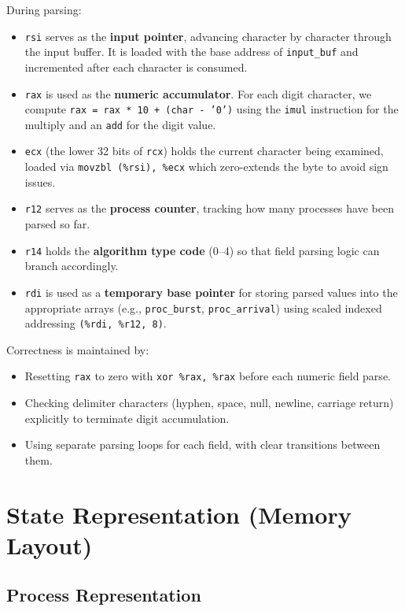 \documentclass[a4paper,12pt]{article}
\begin{document}
During parsing:
\begin{itemize}
    \item \texttt{rsi} serves as the \textbf{input pointer}, advancing character by character through the input buffer. It is loaded with the base address of \texttt{input\_buf} and incremented after each character is consumed.
    \item \texttt{rax} is used as the \textbf{numeric accumulator}. For each digit character, we compute \texttt{rax = rax * 10 + (char - '0')} using the \texttt{imul} instruction for the multiply and an \texttt{add} for the digit value.
    \item \texttt{ecx} (the lower 32 bits of \texttt{rcx}) holds the current character being examined, loaded via \texttt{movzbl (\%rsi), \%ecx} which zero-extends the byte to avoid sign issues.
    \item \texttt{r12} serves as the \textbf{process counter}, tracking how many processes have been parsed so far.
    \item \texttt{r14} holds the \textbf{algorithm type code} (0--4) so that field parsing logic can branch accordingly.
    \item \texttt{rdi} is used as a \textbf{temporary base pointer} for storing parsed values into the appropriate arrays (e.g., \texttt{proc\_burst}, \texttt{proc\_arrival}) using scaled indexed addressing \texttt{(\%rdi, \%r12, 8)}.
\end{itemize}

Correctness is maintained by:
\begin{itemize}
    \item Resetting \texttt{rax} to zero with \texttt{xor \%rax, \%rax} before each numeric field parse.
    \item Checking delimiter characters (hyphen, space, null, newline, carriage return) explicitly to terminate digit accumulation.
    \item Using separate parsing loops for each field, with clear transitions between them.
\end{itemize}


\section{State Representation (Memory Layout)}

\subsection{Process Representation}
\end{document}
